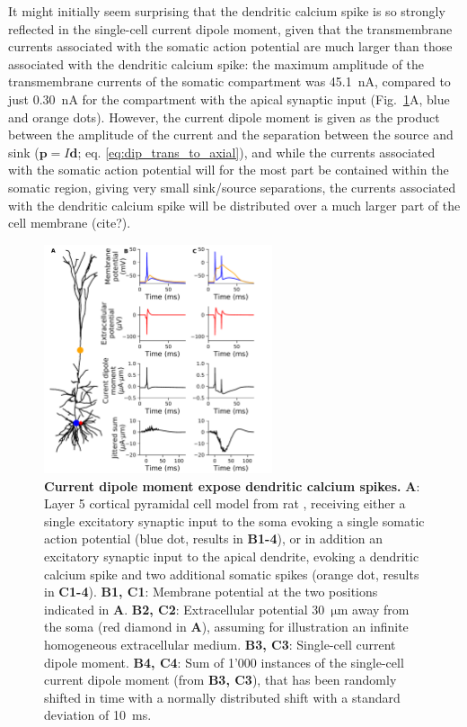 \documentclass[preprint,10pt,authoryear]{elsarticle}
\begin{document}
It might initially seem surprising that the dendritic calcium spike is so strongly reflected in the single-cell current dipole moment, given that the transmembrane currents associated with the somatic action potential are much larger than those associated with the dendritic calcium spike: the maximum amplitude of the transmembrane currents of the somatic compartment was 45.1~$\si{\nA}$, compared to just 0.30~$\si{\nA}$ for the compartment with the apical synaptic input (Fig.~\ref{fig:ca_spike}A, blue and orange dots). However, the current dipole moment is given as the product between the amplitude of the current and the separation between the source and sink ($\mathbf{p}=I\mathbf{d}$; eq. \ref{eq:dip_trans_to_axial}), and while the currents associated with the somatic action potential will for the most part be contained within the somatic region, giving very small sink/source separations, the currents associated with the dendritic calcium spike will be distributed over a much larger part of the cell membrane (cite?).

\begin{figure}[H]
	\centering
	\includegraphics[width=0.6\textwidth]{hay_ca_spike}
	\caption{\textbf{Current dipole moment expose dendritic calcium spikes.}
	\textbf{A}: Layer 5 cortical pyramidal cell model from rat \citep{HAY2011}, receiving either a single excitatory synaptic input to the soma evoking a single somatic action potential (blue dot, results in \textbf{B1-4}), or in addition an excitatory synaptic input to the apical dendrite, evoking a dendritic calcium spike and two additional somatic spikes (orange dot, results in \textbf{C1-4}). 
	\textbf{B1, C1}: Membrane potential at the two positions indicated in \textbf{A}.
	\textbf{B2, C2}: Extracellular potential 30~$\si{\um}$ away from the soma (red diamond in \textbf{A}), assuming for illustration an infinite homogeneous extracellular medium. 
	\textbf{B3, C3}: Single-cell current dipole moment. 
	\textbf{B4, C4}: Sum of 1'000 instances of the single-cell current dipole moment (from \textbf{B3, C3}), that has been randomly shifted in time with a normally distributed shift with a standard deviation of 10~ms.
	}
	\label{fig:ca_spike}
\end{figure}
\end{document}
